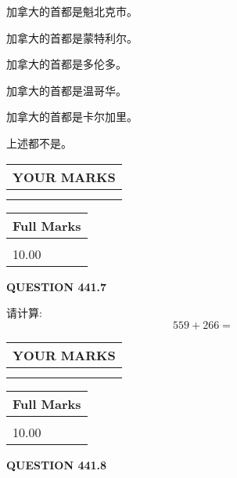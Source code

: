 \documentclass{ctexart}
\begin{document}
  
 
 
加拿大的首都是魁北克市。
 
 
加拿大的首都是蒙特利尔。
 
 
加拿大的首都是多伦多。
 
 
加拿大的首都是温哥华。
 
 
加拿大的首都是卡尔加里。
 
 
 上述都不是。
 
 
  
\vspace{0.2in}
  
\noindent\begin{tabular}{|l|}
\hline
 YOUR MARKS  \\
\hline
 \\ 
 \\ 
\hline
\end{tabular}
\hspace{0.05in} \begin{tabular}{|l|}
\hline
 Full Marks  \\
\hline
 \\ 
10.00 \\
\hline
\end{tabular}
{\textbf{\Large{QUESTION
441.7 
}}}
  
  
 
请计算:
\begin{equation}
559 +  %
266 = \nonumber
\end{equation}
 

 

 
  
\vspace{0.2in}
  
\noindent\begin{tabular}{|l|}
\hline
 YOUR MARKS  \\
\hline
 \\ 
 \\ 
\hline
\end{tabular}
\hspace{0.05in} \begin{tabular}{|l|}
\hline
 Full Marks  \\
\hline
 \\ 
10.00 \\
\hline
\end{tabular}
{\textbf{\Large{QUESTION
441.8 
}}}
  
\end{document}
